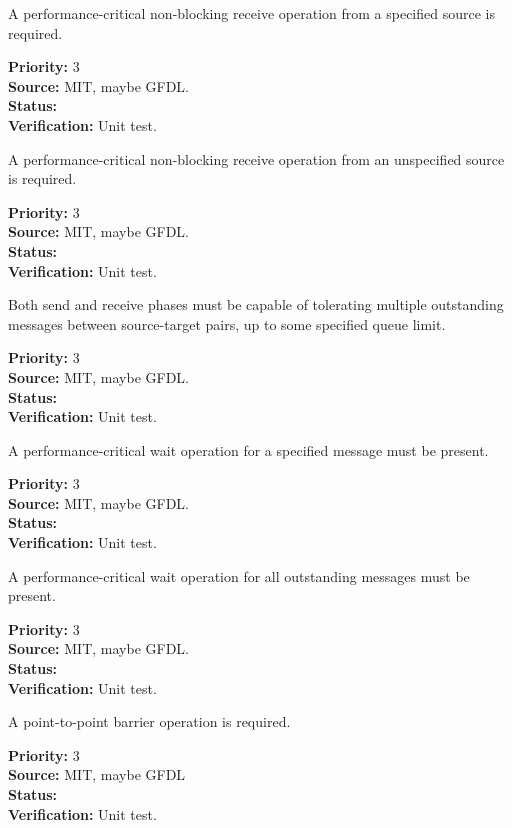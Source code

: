 A performance-critical non-blocking receive operation from a specified
source is required.
\begin{reqlist}
{\bf Priority:} 3 \\
{\bf Source:}  MIT, maybe GFDL. \\
{\bf Status:}  \\
{\bf Verification:} Unit test. 
\end{reqlist}

A performance-critical non-blocking receive operation from an unspecified
source is required.
\begin{reqlist}
{\bf Priority:} 3 \\
{\bf Source:}  MIT, maybe GFDL. \\
{\bf Status:}  \\
{\bf Verification:} Unit test. 
\end{reqlist}

Both send and receive phases must be capable of tolerating multiple
outstanding messages between source-target pairs, up to some specified
queue limit.
\begin{reqlist}
{\bf Priority:} 3 \\
{\bf Source:}  MIT, maybe GFDL. \\
{\bf Status:}  \\
{\bf Verification:} Unit test.
\end{reqlist}

A performance-critical wait operation for a specified message must be present.
\begin{reqlist}
{\bf Priority:} 3 \\
{\bf Source:}  MIT, maybe GFDL. \\
{\bf Status:}  \\
{\bf Verification:} Unit test. 
\end{reqlist}

A performance-critical wait operation for all outstanding messages must be present.
\begin{reqlist}
{\bf Priority:} 3 \\
{\bf Source:}  MIT, maybe GFDL. \\
{\bf Status:}  \\
{\bf Verification:} Unit test. 
\end{reqlist}

A point-to-point barrier operation is required.
\begin{reqlist}
{\bf Priority:} 3 \\
{\bf Source:}  MIT, maybe GFDL \\
{\bf Status:}  \\
{\bf Verification:} Unit test.
\end{reqlist}

